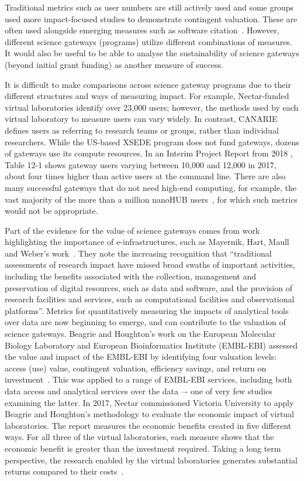 \documentclass[review]{elsarticle}
\begin{document}
Traditional metrics such as user numbers are still actively used and some groups used more impact-focused studies to demonstrate contingent valuation. These are often used alongside emerging measures such as software citation~\cite{force11-32}. However, different science gateways (programs) utilize different combinations of measures. It would also be useful to be able to analyse the sustainability of science gateways (beyond initial grant funding) as another measure of success. 

It is difficult to make comparisons across science gateway programs due to their different structures and ways of measuring impact. For example, Nectar-funded virtual laboratories identify over 23,000 users; however, the methods used by each virtual laboratory to measure users can vary widely. In contrast, CANARIE defines users as referring to research teams or groups, rather than individual researchers. 
While the US-based XSEDE program does not fund gateways, dozens of gateways use its compute resources. 
In an Interim Project Report from 2018 \cite{xsede-85}, Table 12-1 shows gateway users varying between 10,000 and 12,000 in 2017, about four times higher than active users at the command line.  There are also many successful gateways that do not need high-end computing, for example, the vast majority of the more than a million nanoHUB users~\cite{nanohub-33}, for which such metrics would not be appropriate.

Part of the evidence for the value of science gateways comes from work highlighting the importance of e-infrastructures, such as Mayernik, Hart, Maull and Weber's work~\cite{Mayernik-34}. They note the increasing recognition that ``traditional assessments of research impact have missed broad swaths of important activities, including the benefits associated with the collection, management and preservation of digital resources, such as data and software, and the provision of research facilities and services, such as computational facilities and observational platforms''. 
Metrics for quantitatively measuring the impacts of analytical tools over data are now beginning to emerge, and can contribute to the valuation of science gateways. Beagrie and Houghton's work on the European Molecular Biology Laboratory  and European Bioinformatics Institute (EMBL-EBI) assessed the value and impact of the EMBL-EBI by identifying four valuation levels: access (use) value, contingent valuation, efficiency savings, and return on investment~\cite{Beagrie2016-35}. 
This was applied to a range of EMBL-EBI services, including both data access and analytical services over the data –- one of very few studies examining the latter. In 2017, Nectar commissioned Victoria University to apply Beagrie and Houghton's methodology to evaluate the economic impact of virtual laboratories. The report measures the economic benefits created in five different ways. For all three of the virtual laboratories, each measure shows that the economic benefit is greater than the investment required.  Taking a long term perspective, the research enabled by the virtual laboratories generates substantial returns compared to their costs~\cite{nectar-80}.
\end{document}
